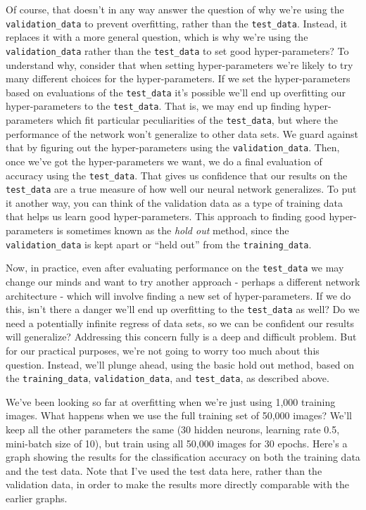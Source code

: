 Of course, that doesn't in any way answer the question of why we're using the \texttt{validation\_\allowbreak{}data} to prevent overfitting, rather than the \texttt{test\_\allowbreak{}data}. Instead, it replaces it with a more general question, which is why we're using the \texttt{validation\_\allowbreak{}data} rather than the \texttt{test\_\allowbreak{}data} to set good hyper-parameters? To understand why, consider that when setting hyper-parameters we're likely to try many different choices for the hyper-parameters. If we set the hyper-parameters based on evaluations of the \texttt{test\_\allowbreak{}data} it's possible we'll end up overfitting our hyper-parameters to the \texttt{test\_\allowbreak{}data}. That is, we may end up finding hyper-parameters which fit particular peculiarities of the \texttt{test\_\allowbreak{}data}, but where the performance of the network won't generalize to other data sets. We guard against that by figuring out the hyper-parameters using the \texttt{validation\_\allowbreak{}data}. Then, once we've got the hyper-parameters we want, we do a final evaluation of accuracy using the \texttt{test\_\allowbreak{}data}. That gives us confidence that our results on the \texttt{test\_\allowbreak{}data} are a true measure of how well our neural network generalizes. To put it another way, you can think of the validation data as a type of training data that helps us learn good hyper-parameters. This approach to finding good hyper-parameters is sometimes known as the \emph{hold out} method, since the \texttt{validation\_\allowbreak{}data} is kept apart or ``held out'' from the \texttt{training\_\allowbreak{}data}.


Now, in practice, even after evaluating performance on the \texttt{test\_\allowbreak{}data} we may change our minds and want to try another approach - perhaps a different network architecture - which will involve finding a new set of hyper-parameters. If we do this, isn't there a danger we'll end up overfitting to the \texttt{test\_\allowbreak{}data} as well? Do we need a potentially infinite regress of data sets, so we can be confident our results will generalize? Addressing this concern fully is a deep and difficult problem. But for our practical purposes, we're not going to worry too much about this question. Instead, we'll plunge ahead, using the basic hold out method, based on the \texttt{training\_\allowbreak{}data}, \texttt{validation\_\allowbreak{}data}, and \texttt{test\_\allowbreak{}data}, as described above.


We've been looking so far at overfitting when we're just using 1,000 training images. What happens when we use the full training set of 50,000 images? We'll keep all the other parameters the same (30 hidden neurons, learning rate 0.5, mini-batch size of 10), but train using all 50,000 images for 30 epochs. Here's a graph showing the results for the classification accuracy on both the training data and the test data. Note that I've used the test data here, rather than the validation data, in order to make the results more directly comparable with the earlier graphs.

